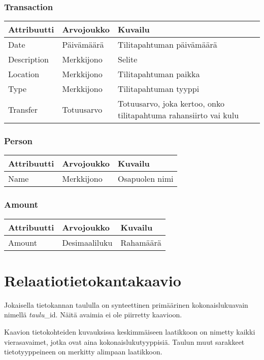 \documentclass[a4paper,parskip=half]{scrartcl}
\begin{document}
\subsubsection{Transaction}
\begin{tabular}{ | l | l | l | }
  \hline
  \textbf{Attribuutti} & \textbf{Arvojoukko} & \textbf{Kuvailu} \\ \hline
  Date & Päivämäärä & Tilitapahtuman päivämäärä \\ \hline
  Description & Merkkijono & Selite \\ \hline
  Location & Merkkijono & Tilitapahtuman paikka \\ \hline
  Type & Merkkijono & Tilitapahtuman tyyppi \\ \hline
  Transfer & Totuusarvo & Totuusarvo, joka kertoo, onko tilitapahtuma
    rahansiirto vai kulu \\ \hline
\end{tabular}

\subsubsection{Person}
\begin{tabular}{ | l | l | l | }
  \hline
  \textbf{Attribuutti} & \textbf{Arvojoukko} & \textbf{Kuvailu} \\ \hline
  Name & Merkkijono & Osapuolen nimi \\ \hline
\end{tabular}

\subsubsection{Amount}
\begin{tabular}{ | l | l | l | }
  \hline
  \textbf{Attribuutti} & \textbf{Arvojoukko} & \textbf{Kuvailu} \\ \hline
  Amount & Desimaaliluku & Rahamäärä \\ \hline
\end{tabular}

\section{Relaatiotietokantakaavio}

Jokaisella tietokannan taululla on synteettinen primäärinen kokonaislukuavain
nimellä \textit{taulu}\_id. Näitä avaimia ei ole piirretty kaavioon.

Kaavion tietokohteiden kuvauksissa keskimmäiseen laatikkoon on nimetty
kaikki vierasavaimet, jotka ovat aina kokonaislukutyyppisiä. Taulun muut
sarakkeet tietotyyppeineen on merkitty alimpaan laatikkoon.
\end{document}
